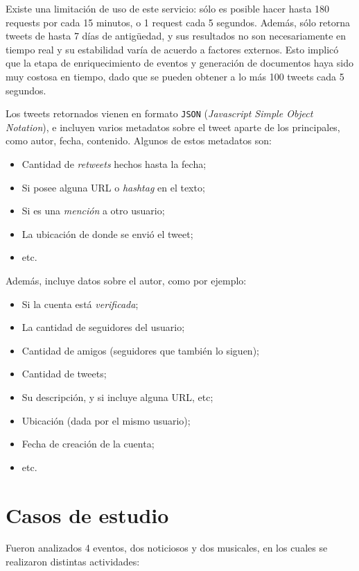   Existe una limitación de uso de este servicio: sólo es posible hacer
   hasta 180 requests por cada 15 minutos, o 1 request cada 5
   segundos. Además, sólo retorna tweets de hasta 7 días de antigüedad, y
   sus resultados no son necesariamente en tiempo real y su estabilidad
   varía de acuerdo a factores externos. Esto implicó que la etapa de
   enriquecimiento de eventos y generación de documentos haya sido muy
   costosa en tiempo, dado que se pueden obtener a lo más 100 tweets
   cada 5 segundos.

   Los tweets retornados vienen en formato \texttt{JSON} (\emph{Javascript Simple Object Notation}),
   e incluyen varios metadatos sobre el tweet aparte de los principales,
   como autor, fecha, contenido. Algunos de estos metadatos son:

\begin{itemize}
\item Cantidad de \emph{retweets} hechos hasta la fecha;
\item Si posee alguna URL o \emph{hashtag} en el texto;
\item Si es una \emph{mención} a otro usuario;
\item La ubicación de donde se envió el tweet;
\item etc.
\end{itemize}
  Además, incluye datos sobre el autor, como por ejemplo:

\begin{itemize}
\item Si la cuenta está \emph{verificada};
\item La cantidad de seguidores del usuario;
\item Cantidad de amigos (seguidores que también lo siguen);
\item Cantidad de tweets;
\item Su descripción, y si incluye alguna URL, etc;
\item Ubicación (dada por el mismo usuario);
\item Fecha de creación de la cuenta;
\item etc.
\end{itemize}
\section{Casos de estudio}
\label{sec-4.4}

\label{casosest}

  Fueron analizados 4 eventos, dos noticiosos y dos musicales, en los
  cuales se realizaron distintas actividades:

